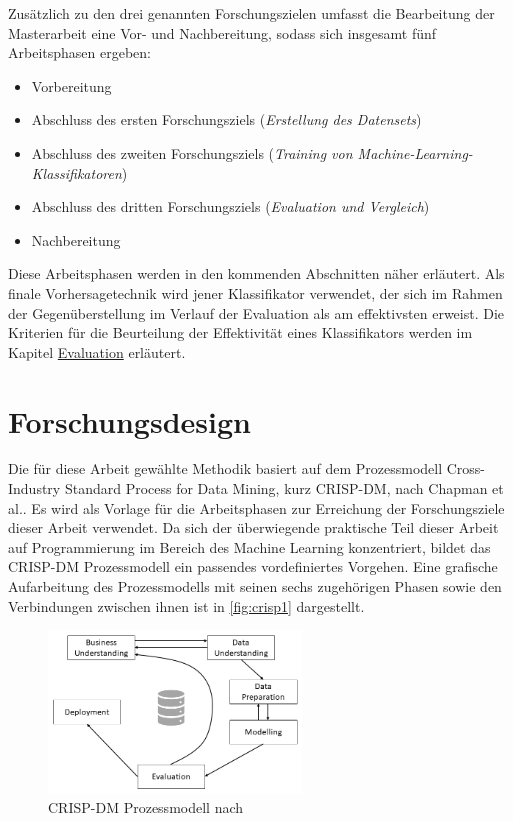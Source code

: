\label{phases_definition}

Zusätzlich zu den drei genannten Forschungszielen umfasst die Bearbeitung der Masterarbeit eine Vor- und Nachbereitung, sodass sich insgesamt fünf Arbeitsphasen ergeben:

\begin{itemize}
\setlength{\itemsep}{-2pt}
\item Vorbereitung
\item Abschluss des ersten Forschungsziels (\textit{Erstellung des Datensets})
\item Abschluss des zweiten Forschungsziels (\textit{Training von Machine-Learning-Klassifikatoren})
\item Abschluss des dritten Forschungsziels (\textit{Evaluation und Vergleich})
\item Nachbereitung
\end{itemize}

Diese Arbeitsphasen werden in den kommenden Abschnitten näher erläutert. Als finale Vorhersagetechnik wird jener Klassifikator verwendet, der sich im Rahmen der Gegenüberstellung im Verlauf der Evaluation als am \glqq effektivsten\grqq{} erweist. Die Kriterien für die Beurteilung der Effektivität eines Klassifikators werden im Kapitel \glqq \hyperref[evaluation]{Evaluation}\grqq{} erläutert.

\section{Forschungsdesign}

Die für diese Arbeit gewählte Methodik basiert auf dem Prozessmodell \glqq Cross-Industry Standard Process for Data Mining\grqq, kurz CRISP-DM, nach Chapman et al.\cite{Chapman2000}. Es wird als Vorlage für die Arbeitsphasen zur Erreichung der Forschungsziele dieser Arbeit verwendet. Da sich der überwiegende praktische Teil dieser Arbeit auf Programmierung im Bereich des Machine Learning konzentriert, bildet das CRISP-DM Prozessmodell ein passendes vordefiniertes Vorgehen. Eine grafische Aufarbeitung des Prozessmodells mit seinen sechs zugehörigen Phasen sowie den Verbindungen zwischen ihnen ist in \autoref{fig:crisp1} dargestellt. 

\begin{figure}[H]
    \centering
    \includegraphics[width=0.6\textwidth]{images/CRISP-DM1}
    \caption{CRISP-DM Prozessmodell nach \cite{Chapman2000}}\label{fig:crisp1}
\end{figure}

